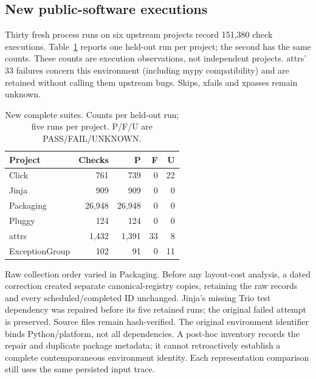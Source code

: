 \subsection{New public-software executions}
Thirty fresh process runs on six upstream projects record 151,380 check
executions. Table~\ref{tab:v11-cohort} reports one held-out run per project;
the second has the same counts. These counts are execution observations,
not independent projects. attrs' 33 failures concern this environment
(including mypy compatibility) and are retained without calling them
upstream bugs. Skips, xfails and xpasses remain unknown.

\begin{table}[t]\centering\footnotesize
\caption{New complete suites. Counts per held-out run; five runs per project.
P/F/U are PASS/FAIL/UNKNOWN.}\label{tab:v11-cohort}
\begin{tabular}{@{}lrrrr@{}}\toprule
Project & Checks & P & F & U\\\midrule
Click & 761 & 739 & 0 & 22 \\
Jinja & 909 & 909 & 0 & 0 \\
Packaging & 26,948 & 26,948 & 0 & 0 \\
Pluggy & 124 & 124 & 0 & 0 \\
attrs & 1,432 & 1,391 & 33 & 8 \\
ExceptionGroup & 102 & 91 & 0 & 11 \\
\bottomrule\end{tabular}
\end{table}

Raw collection order varied in Packaging. Before any layout-cost analysis,
a dated correction created separate canonical-registry copies, retaining
the raw records and every scheduled/completed ID unchanged. Jinja's missing
Trio test dependency was repaired before its five retained runs; the original
failed attempt is preserved. Source files remain hash-verified. The original
environment identifier binds Python/platform, not all dependencies.
A post-hoc inventory records the repair and duplicate package metadata;
it cannot retroactively establish a complete contemporaneous environment
identity. Each representation comparison still uses the same persisted
input trace.

